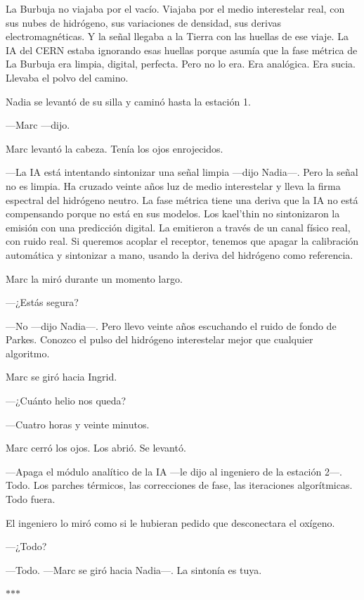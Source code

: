 \documentclass[11pt,a5paper,twoside]{book}
\begin{document}
La Burbuja no viajaba por el vacío. Viajaba por el medio interestelar real, con sus nubes de hidrógeno, sus variaciones de densidad, sus derivas electromagnéticas. Y la señal llegaba a la Tierra con las huellas de ese viaje. La IA del CERN estaba ignorando esas huellas porque asumía que la fase métrica de La Burbuja era limpia, digital, perfecta. Pero no lo era. Era analógica. Era sucia. Llevaba el polvo del camino.

Nadia se levantó de su silla y caminó hasta la estación 1.

—Marc —dijo.

Marc levantó la cabeza. Tenía los ojos enrojecidos.

—La IA está intentando sintonizar una señal limpia —dijo Nadia—. Pero la señal no es limpia. Ha cruzado veinte años luz de medio interestelar y lleva la firma espectral del hidrógeno neutro. La fase métrica tiene una deriva que la IA no está compensando porque no está en sus modelos. Los kael'thin no sintonizaron la emisión con una predicción digital. La emitieron a través de un canal físico real, con ruido real. Si queremos acoplar el receptor, tenemos que apagar la calibración automática y sintonizar a mano, usando la deriva del hidrógeno como referencia.

Marc la miró durante un momento largo.

—¿Estás segura?

—No —dijo Nadia—. Pero llevo veinte años escuchando el ruido de fondo de Parkes. Conozco el pulso del hidrógeno interestelar mejor que cualquier algoritmo.

Marc se giró hacia Ingrid.

—¿Cuánto helio nos queda?

—Cuatro horas y veinte minutos.

Marc cerró los ojos. Los abrió. Se levantó.

—Apaga el módulo analítico de la IA —le dijo al ingeniero de la estación 2—. Todo. Los parches térmicos, las correcciones de fase, las iteraciones algorítmicas. Todo fuera.

El ingeniero lo miró como si le hubieran pedido que desconectara el oxígeno.

—¿Todo?

—Todo. —Marc se giró hacia Nadia—. La sintonía es tuya.

\vspace{1.5em}
\begin{center}$\ast$\quad$\ast$\quad$\ast$\end{center}
\vspace{1.5em}
\end{document}
